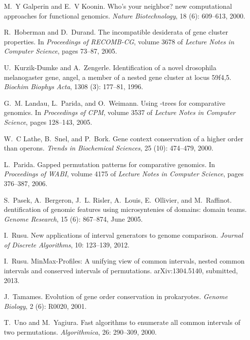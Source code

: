\documentclass{article}
\begin{document}
\begin{thebibliography}{18}
M.~Y Galperin and E.~V Koonin.
\newblock Who's your neighbor? new computational approaches for functional
  genomics.
\newblock \emph{Nature Biotechnology}, 18 (6): 609--613,
  2000.

R.~Hoberman and D.~Durand.
\newblock The incompatible desiderata of gene cluster properties.
\newblock In \emph{Proceedings of RECOMB-CG}, volume 3678 of \emph{Lecture
  Notes in Computer Science}, pages 73--87, 2005.

U.~Kurzik-Dumke and A.~Zengerle.
\newblock Identification of a novel drosophila melanogaster gene, angel, a
  member of a nested gene cluster at locus 59f4,5.
\newblock \emph{Biochim Biophys Acta}, 1308 (3): 177--81,
  1996.

G.~M. Landau, L.~Parida, and O.~Weimann.
\newblock Using {}-trees for comparative genomics.
\newblock In \emph{Proceedings of CPM}, volume 3537 of \emph{Lecture Notes in
  Computer Science}, pages 128--143, 2005.

W.~C Lathe, B.~Snel, and P.~Bork.
\newblock Gene context conservation of a higher order than operons.
\newblock \emph{Trends in Biochemical Sciences}, 25 (10):
  474--479, 2000.

L.~Parida.
\newblock Gapped permutation patterns for comparative genomics.
\newblock In \emph{Proceedings of WABI}, volume 4175 of \emph{Lecture Notes in
  Computer Science}, pages 376--387, 2006.

S.~Pasek, A.~Bergeron, J.~L. Risler, A.~Louis, E.~Ollivier, and M.~Raffinot.
dentification of genomic features using microsyntenies of domains:
  domain teams.
\newblock \emph{Genome Research}, 15 (6): 867--874, June
  2005.

I.~Rusu.
\newblock New applications of interval generators to genome comparison.
\newblock \emph{Journal of Discrete Algorithms}, 10: 123--139, 2012.

I.~Rusu.
\newblock Min{M}ax-{P}rofiles: A unifying view of common intervals, nested
  common intervals and conserved intervals of {} permutations.
\newblock arXiv:1304.5140, submitted, 2013.

J.~Tamames.
\newblock Evolution of gene order conservation in prokaryotes.
\newblock \emph{Genome Biology}, 2 (6): R0020, 2001.

T.~Uno and M.~Yagiura.
\newblock Fast algorithms to enumerate all common intervals of two
  permutations.
\newblock \emph{Algorithmica}, 26: 290--309, 2000.

\end{thebibliography}
\end{document}
